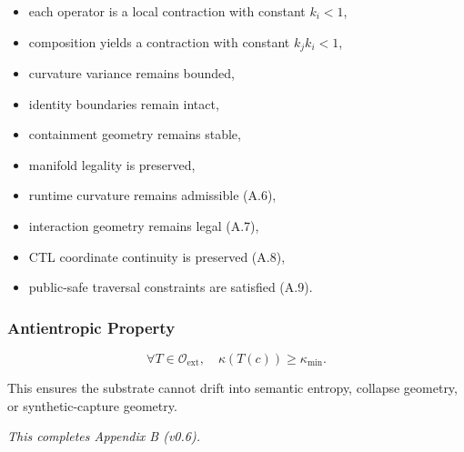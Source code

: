 \begin{itemize}
    \item each operator is a local contraction with constant $k_i < 1$,
    \item composition yields a contraction with constant $k_j k_i < 1$,
    \item curvature variance remains bounded,
    \item identity boundaries remain intact,
    \item containment geometry remains stable,
    \item manifold legality is preserved,
    \item runtime curvature remains admissible (A.6),
    \item interaction geometry remains legal (A.7),
    \item CTL coordinate continuity is preserved (A.8),
    \item public-safe traversal constraints are satisfied (A.9).
\end{itemize}

\subsubsection*{Antientropic Property}



\[
\forall T \in \mathcal{O}_{\mathrm{ext}}, \quad
\kappa(T(c)) \ge \kappa_{\min}.
\]



\noindent This ensures the substrate cannot drift into semantic entropy, collapse
geometry, or synthetic-capture geometry.

\medskip
\noindent\textit{This completes Appendix B (v0.6).}
